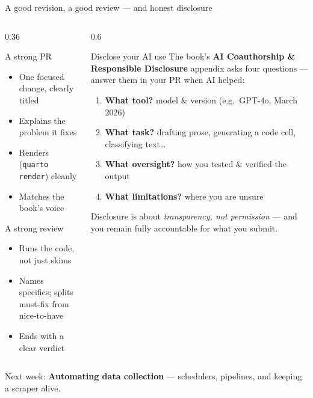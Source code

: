 \documentclass[9pt,aspectratio=169]{beamer}
\begin{document}
\begin{frame}{A good revision, a good review --- and honest disclosure}
    \begin{columns}[T]
        \begin{column}{0.36\textwidth}
            \begin{block}{A strong PR}
                \begin{itemize}\footnotesize
                    \item One focused change, clearly titled
                    \item Explains the problem it fixes
                    \item Renders (\texttt{quarto render}) cleanly
                    \item Matches the book's voice
                \end{itemize}
            \end{block}
            \begin{block}{A strong review}
                \begin{itemize}\footnotesize
                    \item Runs the code, not just skims
                    \item Names specifics; splits must-fix from nice-to-have
                    \item Ends with a clear verdict
                \end{itemize}
            \end{block}
        \end{column}
        \begin{column}{0.6\textwidth}
            \begin{alertblock}{Disclose your AI use}
                \footnotesize The book's \textbf{AI Coauthorship \& Responsible Disclosure} appendix asks four questions --- answer them in your PR when AI helped:
                \begin{enumerate}\footnotesize
                    \item \textbf{What tool?} model \& version (e.g.\ GPT-4o, March 2026)
                    \item \textbf{What task?} drafting prose, generating a code cell, classifying text\dots
                    \item \textbf{What oversight?} how you tested \& verified the output
                    \item \textbf{What limitations?} where you are unsure
                \end{enumerate}
                \vspace{0.2em}
                {\scriptsize Disclosure is about \textit{transparency, not permission} --- and you remain fully accountable for what you submit.}
            \end{alertblock}
        \end{column}
    \end{columns}
    \vspace{0.3em}
    \centering\small Next week: \textbf{Automating data collection} --- schedulers, pipelines, and keeping a scraper alive.
\end{frame}
\end{document}
